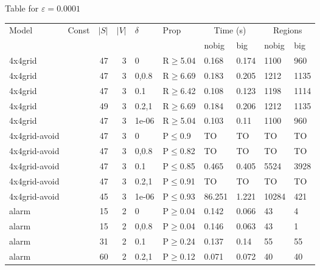 \small Table for \(\varepsilon=0.0001\)
\begin{longtable}{llrrllllll}

        \toprule
        Model & Const & $|S|$ & $|V|$ & $\delta$ & Prop & \multicolumn{2}{c}{Time (s)} & \multicolumn{2}{c}{Regions} \\
        \cmidrule(ll){7-8} \cmidrule(ll){9-10}
        & & & & & & nobig & big & nobig & big \\
        \midrule
        
 4x4grid       &           &     	47 &   3 & 0     & R$\geq$5.04  & 0.168    & 0.174    & 1100    & 960     \\
 4x4grid       &           &     	47 &   3 & 0,0.8 & R$\geq$6.69  & 0.183    & 0.205    & 1212    & 1135    \\
 4x4grid       &           &     	47 &   3 & 0.1   & R$\geq$6.42  & 0.108    & 0.123    & 1198    & 1114    \\
 4x4grid       &           &     	49 &   3 & 0.2,1 & R$\geq$6.69  & 0.184    & 0.206    & 1212    & 1135    \\
 4x4grid       &           &     	47 &   3 & 1e-06 & R$\geq$5.04  & 0.103    & 0.11     & 1100    & 960     \\
 4x4grid-avoid &           &     	47 &   3 & 0     & P$\leq$0.9   & TO       & TO       & TO      & TO      \\
 4x4grid-avoid &           &     	47 &   3 & 0,0.8 & P$\leq$0.82  & TO       & TO       & TO      & TO      \\
 4x4grid-avoid &           &     	47 &   3 & 0.1   & P$\leq$0.85  & 0.465    & 0.405    & 5524    & 3928    \\
 4x4grid-avoid &           &     	47 &   3 & 0.2,1 & P$\leq$0.91  & TO       & TO       & TO      & TO      \\
 4x4grid-avoid &           &     	45 &   3 & 1e-06 & P$\leq$0.93  & 86.251   & 1.221    & 10284   & 421     \\
 alarm         &           &     	15 &   2 & 0     & P$\geq$0.04  & 0.142    & 0.066    & 43      & 4       \\
 alarm         &           &     	15 &   2 & 0,0.8 & P$\geq$0.04  & 0.146    & 0.063    & 43      & 1       \\
 alarm         &           &     	31 &   2 & 0.1   & P$\geq$0.24  & 0.137    & 0.14     & 55      & 55      \\
 alarm         &           &     	60 &   2 & 0.2,1 & P$\geq$0.12  & 0.071    & 0.072    & 40      & 40      \\

\end{longtable}
